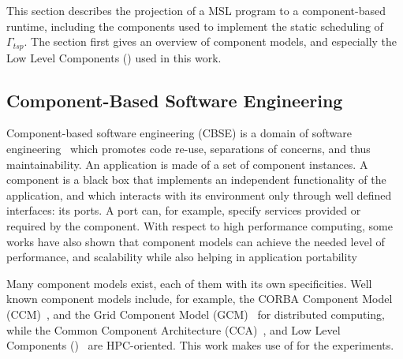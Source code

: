 This section describes the projection of a MSL program to a component-based runtime, including the components used to implement the static scheduling of $\Gamma_{tsp}$.
The section first gives an overview of component models, and especially the Low Level Components (\llc) used in this work.


\subsection{Component-Based Software Engineering}
Component-based software engineering (CBSE) is a domain of software engineering~\cite{Szyperski:2002:CSB:515228} which promotes code
re-use, separations of concerns, and thus maintainability.
An application is made of a set of component instances.
A component is a black box that implements an independent functionality of the application, and which interacts with its environment only through well defined interfaces: its ports.
A port can, for example, specify services provided or required by the component.
With respect to high performance computing, some works have also shown
that component models can achieve the needed level of performance, and
scalability while also helping in application
portability~\cite{Bernholdt01052006, bigot:inria-00388508, UCHPC2015}

Many component models exist, each of them with its own specificities.
Well known component models include, for example, the CORBA Component Model (CCM)~\cite{corba:omg06}, and the Grid Component Model (GCM)~\cite{Baude} for distributed computing, while the Common Component Architecture (CCA)~\cite{Bernholdt01052006}, and Low Level Components (\llc)~\cite{l2c} are HPC-oriented.
This work makes use of \llc for the experiments.

\subsection{\llc}

